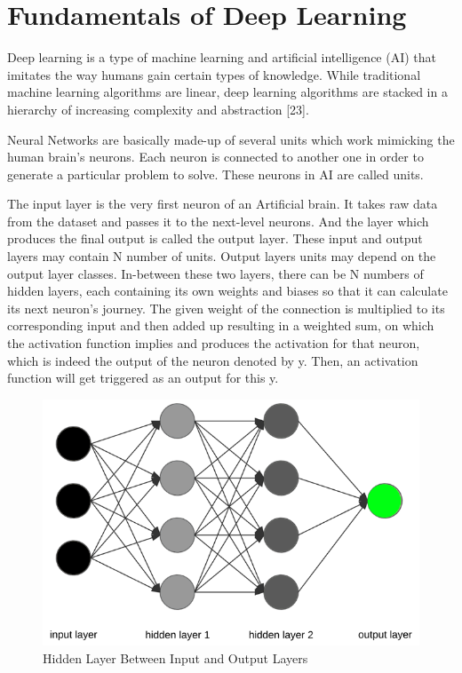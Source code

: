 \section{Fundamentals of Deep Learning}

Deep learning is a type of machine learning and artificial intelligence (AI) that imitates the way humans gain certain types of knowledge. While traditional machine learning algorithms are linear, deep learning algorithms are stacked in a hierarchy of increasing complexity and abstraction [23].

\vspace{5mm}
Neural Networks are basically made-up of several units which work mimicking the human brain's neurons. Each neuron is connected to another one in order to generate a particular problem to solve. These neurons in AI are called units.

\vspace{5mm}
The input layer is the very first neuron of an Artificial brain. It takes raw data from the dataset and passes it to the next-level neurons. And the layer which produces the final output is called the output layer. These input and output layers may contain N number of units. Output layers units may depend on the output layer classes. In-between these two layers, there can be N numbers of hidden layers, each containing its own weights and biases so that it can calculate its next neuron's journey. The given weight of the connection is multiplied to its corresponding input and then added up resulting in a weighted sum, on which the activation function implies and produces the activation for that neuron, which is indeed the output of the neuron denoted by y. Then, an activation function will get triggered as an output for this y.

\vspace{5mm}
\begin{figure}[hbt!]
\centering
\includegraphics[scale=0.25]{images/fig-4.png}
\caption{Hidden Layer Between Input and Output Layers}
\label{fig:x Hidden Layer Between Input and Output Layers}
\end{figure}

